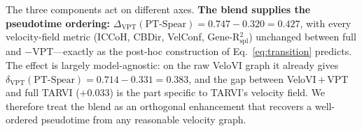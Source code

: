 \documentclass[11pt]{article}
\begin{document}
\begin{table}[h]
\centering
\caption{Component ablation: cross-dataset mean performance over all five datasets.
VeloVI\,$+$\,VPT applies the blend ($\beta{=}0.7$) to the unmodified VeloVI velocity
graph. Best per column among configurations in bold. All metrics $\uparrow$.}
\label{tab:ablation}
\end{table}

The three components act on different axes. \textbf{The blend supplies the pseudotime
ordering:} $\Delta_{\text{VPT}}(\text{PT-Spear})=0.747-0.320=0.427$, with every
velocity-field metric (ICCoH, CBDir, VelConf, Gene-R$^2_\text{spl}$) unchanged between
full and $-$VPT---exactly as the post-hoc construction of Eq.~\eqref{eq:transition}
predicts. The effect is largely model-agnostic: on the raw VeloVI graph it already
gives $\delta_{\text{VPT}}(\text{PT-Spear})=0.714-0.331=0.383$, and the gap between
VeloVI\,$+$\,VPT and full TARVI ($+0.033$) is the part specific to TARVI's velocity
field. We therefore treat the blend as an orthogonal enhancement that recovers a
well-ordered pseudotime from any reasonable velocity graph.
\end{document}
